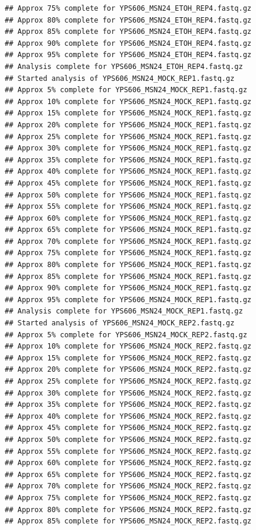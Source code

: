 \documentclass[
]{book}
\begin{document}
\begin{verbatim}
## Approx 75% complete for YPS606_MSN24_ETOH_REP4.fastq.gz
## Approx 80% complete for YPS606_MSN24_ETOH_REP4.fastq.gz
## Approx 85% complete for YPS606_MSN24_ETOH_REP4.fastq.gz
## Approx 90% complete for YPS606_MSN24_ETOH_REP4.fastq.gz
## Approx 95% complete for YPS606_MSN24_ETOH_REP4.fastq.gz
## Analysis complete for YPS606_MSN24_ETOH_REP4.fastq.gz
## Started analysis of YPS606_MSN24_MOCK_REP1.fastq.gz
## Approx 5% complete for YPS606_MSN24_MOCK_REP1.fastq.gz
## Approx 10% complete for YPS606_MSN24_MOCK_REP1.fastq.gz
## Approx 15% complete for YPS606_MSN24_MOCK_REP1.fastq.gz
## Approx 20% complete for YPS606_MSN24_MOCK_REP1.fastq.gz
## Approx 25% complete for YPS606_MSN24_MOCK_REP1.fastq.gz
## Approx 30% complete for YPS606_MSN24_MOCK_REP1.fastq.gz
## Approx 35% complete for YPS606_MSN24_MOCK_REP1.fastq.gz
## Approx 40% complete for YPS606_MSN24_MOCK_REP1.fastq.gz
## Approx 45% complete for YPS606_MSN24_MOCK_REP1.fastq.gz
## Approx 50% complete for YPS606_MSN24_MOCK_REP1.fastq.gz
## Approx 55% complete for YPS606_MSN24_MOCK_REP1.fastq.gz
## Approx 60% complete for YPS606_MSN24_MOCK_REP1.fastq.gz
## Approx 65% complete for YPS606_MSN24_MOCK_REP1.fastq.gz
## Approx 70% complete for YPS606_MSN24_MOCK_REP1.fastq.gz
## Approx 75% complete for YPS606_MSN24_MOCK_REP1.fastq.gz
## Approx 80% complete for YPS606_MSN24_MOCK_REP1.fastq.gz
## Approx 85% complete for YPS606_MSN24_MOCK_REP1.fastq.gz
## Approx 90% complete for YPS606_MSN24_MOCK_REP1.fastq.gz
## Approx 95% complete for YPS606_MSN24_MOCK_REP1.fastq.gz
## Analysis complete for YPS606_MSN24_MOCK_REP1.fastq.gz
## Started analysis of YPS606_MSN24_MOCK_REP2.fastq.gz
## Approx 5% complete for YPS606_MSN24_MOCK_REP2.fastq.gz
## Approx 10% complete for YPS606_MSN24_MOCK_REP2.fastq.gz
## Approx 15% complete for YPS606_MSN24_MOCK_REP2.fastq.gz
## Approx 20% complete for YPS606_MSN24_MOCK_REP2.fastq.gz
## Approx 25% complete for YPS606_MSN24_MOCK_REP2.fastq.gz
## Approx 30% complete for YPS606_MSN24_MOCK_REP2.fastq.gz
## Approx 35% complete for YPS606_MSN24_MOCK_REP2.fastq.gz
## Approx 40% complete for YPS606_MSN24_MOCK_REP2.fastq.gz
## Approx 45% complete for YPS606_MSN24_MOCK_REP2.fastq.gz
## Approx 50% complete for YPS606_MSN24_MOCK_REP2.fastq.gz
## Approx 55% complete for YPS606_MSN24_MOCK_REP2.fastq.gz
## Approx 60% complete for YPS606_MSN24_MOCK_REP2.fastq.gz
## Approx 65% complete for YPS606_MSN24_MOCK_REP2.fastq.gz
## Approx 70% complete for YPS606_MSN24_MOCK_REP2.fastq.gz
## Approx 75% complete for YPS606_MSN24_MOCK_REP2.fastq.gz
## Approx 80% complete for YPS606_MSN24_MOCK_REP2.fastq.gz
## Approx 85% complete for YPS606_MSN24_MOCK_REP2.fastq.gz

\end{verbatim}
\end{document}
